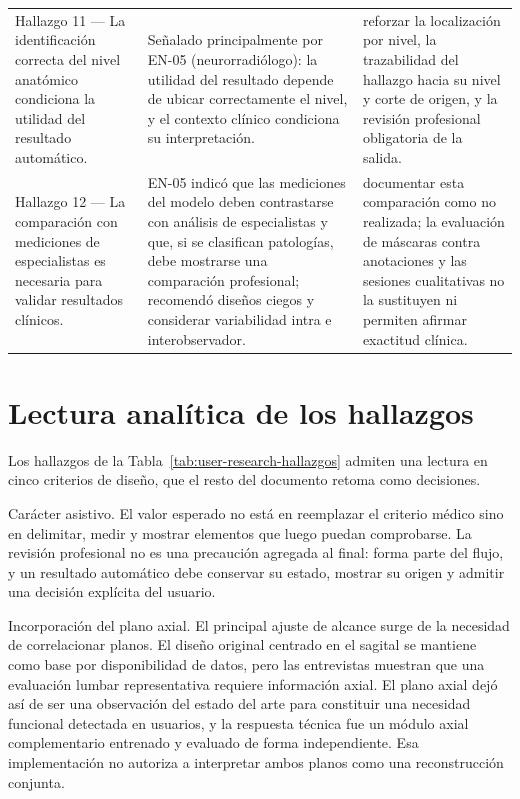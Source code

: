 {\begin{longtable}{>{\raggedright\arraybackslash}p{} >{\raggedright\arraybackslash}p{} >{\raggedright\arraybackslash}p{}}
Hallazgo 11 — La identificación correcta del nivel anatómico condiciona la utilidad del resultado automático. & Señalado principalmente por EN-05 (neurorradiólogo): la utilidad del resultado depende de ubicar correctamente el nivel, y el contexto clínico condiciona su interpretación. & reforzar la localización por nivel, la trazabilidad del hallazgo hacia su nivel y corte de origen, y la revisión profesional obligatoria de la salida. \\
Hallazgo 12 — La comparación con mediciones de especialistas es necesaria para validar resultados clínicos. & EN-05 indicó que las mediciones del modelo deben contrastarse con análisis de especialistas y que, si se clasifican patologías, debe mostrarse una comparación profesional; recomendó diseños ciegos y considerar variabilidad intra e interobservador. & documentar esta comparación como no realizada; la evaluación de máscaras contra anotaciones y las sesiones cualitativas no la sustituyen ni permiten afirmar exactitud clínica. \\
\hline
\end{longtable}
}

\section{Lectura analítica de los hallazgos}

Los hallazgos de la Tabla~\ref{tab:user-research-hallazgos} admiten una lectura en cinco criterios de diseño, que el resto del documento retoma como decisiones.

Carácter asistivo. El valor esperado no está en reemplazar el criterio médico sino en delimitar, medir y mostrar elementos que luego puedan comprobarse. La revisión profesional no es una precaución agregada al final: forma parte del flujo, y un resultado automático debe conservar su estado, mostrar su origen y admitir una decisión explícita del usuario.

Incorporación del plano axial. El principal ajuste de alcance surge de la necesidad de correlacionar planos. El diseño original centrado en el sagital se mantiene como base por disponibilidad de datos, pero las entrevistas muestran que una evaluación lumbar representativa requiere información axial. El plano axial dejó así de ser una observación del estado del arte para constituir una necesidad funcional detectada en usuarios, y la respuesta técnica fue un módulo axial complementario entrenado y evaluado de forma independiente. Esa implementación no autoriza a interpretar ambos planos como una reconstrucción conjunta.

